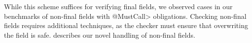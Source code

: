   While this scheme suffices for verifying final fields, we observed cases
  in our benchmarks of non-final fields with \<@MustCall> obligations.  Checking
  non-final fields requires additional techniques, as the checker must ensure
  that overwriting the field is safe.
   describes our novel handling of non-final fields.


